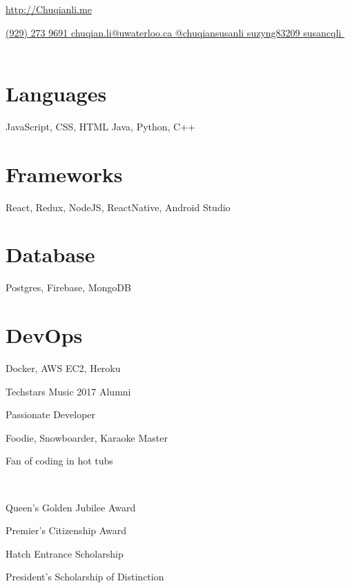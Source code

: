 \documentclass[]{friggeri-cv}
\begin{document}
       {\href{http://chuqianli.me}{http://Chuqianli.me}}


\begin{aside}
  \href{tel:19292739691}{(929) 273 9691 \faPhone}
  \href{mailto:chuqian.li@edu.uwaterloo.ca}{chuqian.li@uwaterloo.ca \faEnvelopeO}
  \href{https://medium.com/@chuqiansusanli}{@chuqiansusanli \faMedium}
  \href{https://github.com/suzyng83209}{suzyng83209 \faGithub}
  \href{https://www.linkedin.com/in/susancqli}{susancqli \faLinkedin}
  \
  \supersection{}
  \
  \supersection{}
  \
  \section{Languages}
  JavaScript, CSS, HTML
  Java, Python, C++
  \section{Frameworks}
  React, Redux, NodeJS, ReactNative, Android Studio
  \section{Database}
  Postgres, Firebase, MongoDB
  \section{DevOps}
  Docker, AWS EC2, Heroku
  \
  \supersection{}
  \
  \begin{description}\raggedleft
  	\item Techstars Music 2017 Alumni
  	\item Passionate Developer
  	\item Foodie, Snowboarder, Karaoke Master
  	\item Fan of coding in hot tubs
  \end{description}
	\
	\supersection{}
	\
	\begin{description}\raggedleft
		\item Queen's Golden Jubilee Award
		\item Premier's Citizenship Award
		\item Hatch Entrance Scholarship
		\item President's Scholarship of Distinction
	\end{description}
\end{aside}
\end{document}
